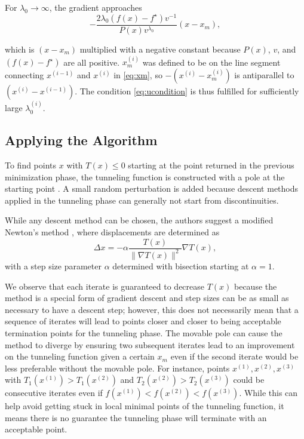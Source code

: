 \documentclass[a4paper,12pt,twoside]{article}
\begin{document}
For $\lambda_0 \to \infty$, the gradient approaches 
\begin{equation} \label{eq:gradapprox}
    -\frac{2\lambda_0(f(x) - f^\star)v^{-1}}{P(x)v^{\lambda_0}}(x-x_m),
\end{equation}

which is $(x-x_m)$ multiplied with a negative constant because $P(x)$, $v$, and $(f(x) - f^\star)$ are all positive. $x_m^{(i)}$ was defined to be on the line segment connecting $x^{(i-1)}$ and $x^{(i)}$ in \eqref{eq:xm}, so $-(x^{(i)}-x_m^{(i)})$ is antiparallel to $(x^{(i)} - x^{(i-1)})$. The condition \eqref{eq:ucondition} is thus fulfilled for sufficiently large $\lambda_0^{(i)}$.

\subsection{Applying the Algorithm}
To find points $x$ with $T(x) \leq 0$ starting at the point returned in the previous minimization phase, the tunneling function is constructed with a pole at the starting point \cite[26--27]{levy_tunneling_1985}. A small random perturbation is added because descent methods applied in the tunneling phase can generally not start from discontinuities.

While any descent method can be chosen, the authors suggest a modified Newton's method \cite[28]{levy_tunneling_1985}, where displacements are determined as \cite[\S 2.3.4]{levy_tunneling_1985}
\begin{equation}\label{eq:Delta_x}
\Delta x = - \alpha \frac{T(x)}{\|\nabla T(x) \|^2} \nabla T(x),
\end{equation}
with a step size parameter $\alpha$ determined with bisection starting at $\alpha = 1$. 

We observe that each iterate is guaranteed to decrease $T(x)$ because the method is a special form of gradient descent and step sizes can be as small as necessary to have a descent step; however, this does not necessarily mean that a sequence of iterates will lead to points closer and closer to being acceptable termination points for the tunneling phase. The movable pole can cause the method to diverge by ensuring two subsequent iterates lead to an improvement on the tunneling function given a certain $x_m$ even if the second iterate would be less preferable without the movable pole. For instance, points $x^{(1)}, x^{(2)}, x^{(3)}$ with $T_1(x^{(1)}) > T_1(x^{(2)})$ and $T_2(x^{(2)}) > T_2(x^{(3)})$ could be consecutive iterates even if $f(x^{(1)}) < f(x^{(2)}) < f(x^{(3)})$. While this can help avoid getting stuck in local minimal points of the tunneling function, it means there is no guarantee the tunneling phase will terminate with an acceptable point.
\end{document}
